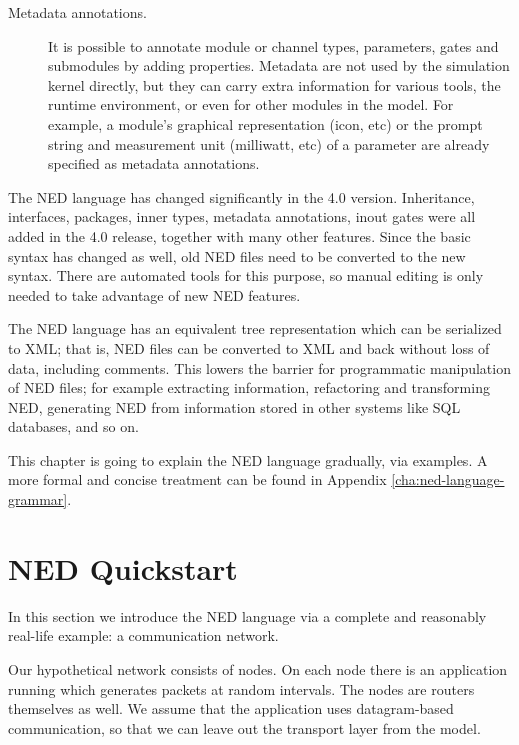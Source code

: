 \begin{description}
\item[Metadata annotations.] It is possible to annotate module or channel
types, parameters, gates and submodules by adding properties. Metadata are
not used by the simulation kernel directly, but they can carry extra
information for various tools, the runtime environment, or even for other
modules in the model. For example, a module's graphical representation
(icon, etc)  or the prompt string and measurement unit (milliwatt, etc) of a
parameter are already specified as metadata annotations.

\end{description}

\begin{note}
    The NED language has changed significantly in the 4.0 version.
    Inheritance, interfaces, packages, inner types, metadata annotations, inout
    gates were all added in the 4.0 release, together with many other features.
    Since the basic syntax has changed as well, old NED files need to be
    converted to the new syntax. There are automated tools for this purpose, so
    manual editing is only needed to take advantage of new NED features.
\end{note}

The NED language has an equivalent tree representation which can be
serialized to XML; that is, NED files can be converted to XML and back
without loss of data, including comments. This lowers the barrier for
programmatic manipulation of NED files; for example extracting information,
refactoring and transforming NED, generating NED from information stored in
other systems like SQL databases, and so on.

\begin{note}
    This chapter is going to explain the NED language gradually, via examples.
    A more formal and concise treatment can be found in Appendix \ref{cha:ned-language-grammar}.
\end{note}


\section{NED Quickstart}
\label{sec:ned-lang:warmup}

In this section we introduce the NED language via a complete and
reasonably real-life example: a communication network.

Our hypothetical network consists of nodes. On each node there is an
application running which generates packets at random intervals.
The nodes are routers themselves as well. We assume that the application
uses datagram-based communication, so that we can leave out the
transport layer from the model.


